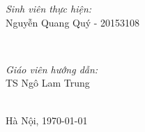 \documentclass[../report.tex]{subfiles}
\begin{document}
\begin{titlepage}
 
\begin{minipage}{0.4\textwidth}
\begin{flushleft} \large
\emph{Sinh viên thực hiện:}\\
Nguyễn Quang Quý - 20153108 \\
\end{flushleft}
\end{minipage}
~
\begin{minipage}{0.4\textwidth}
\begin{flushright} \large
\emph{Giáo viên hướng dẫn:} \\
TS Ngô Lam Trung
\end{flushright}
\end{minipage}\\[3cm]

{\large Hà Nội, \today}\\[1cm] %



\vfill %

\end{titlepage}
\end{document}
